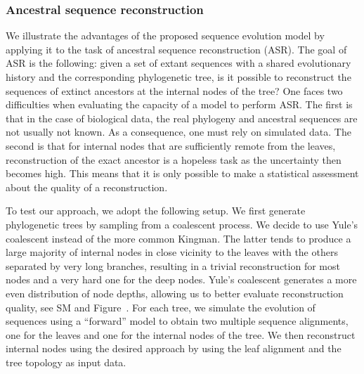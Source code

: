 \subsubsection{Ancestral sequence reconstruction}

We illustrate the advantages of the proposed sequence evolution model by applying it to the task of ancestral sequence reconstruction (ASR). 
The goal of ASR is the following: given a set of extant sequences with a shared evolutionary history and the corresponding phylogenetic tree, is it possible to reconstruct the sequences of extinct ancestors at the internal nodes of the tree? 
One faces two difficulties when evaluating the capacity of a model to perform ASR. 
The first is that in the case of biological data, the real phylogeny and ancestral sequences are not usually not known. 
As a consequence, one must rely on simulated data. 
The second is that for internal nodes that are sufficiently remote from the leaves, reconstruction of the exact ancestor is a hopeless task as the uncertainty then becomes high. 
This means that it is only possible to make a statistical assessment about the quality of a reconstruction. 

To test our approach, we adopt the following setup. 
We first generate phylogenetic trees by sampling from a coalescent process.
We decide to use Yule's coalescent instead of the more common Kingman.
The latter tends to produce a large majority of internal nodes in close vicinity to the leaves with the others separated by very long branches, resulting in a trivial reconstruction for most nodes and a very hard one for the deep nodes. 
Yule's coalescent generates a more even distribution of node depths, allowing us to better evaluate reconstruction quality, see SM and Figure~.
For each tree, we simulate the evolution of sequences using a ``forward'' model to obtain two multiple sequence alignments, one for the leaves and one for the internal nodes of the tree.
We then reconstruct internal nodes using the desired approach by using the leaf alignment and the tree topology as input data. 

